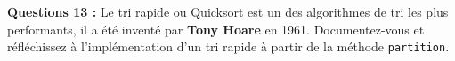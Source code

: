 \documentclass[iutinfo, a4paper, nocorrection, 10pt]{ustl-tdtp}
\begin{document}
\textbf{Questions 13 : }\newline
Le tri rapide ou Quicksort est un des algorithmes de tri les plus performants, il a été inventé par \textbf{Tony Hoare} en 1961. Documentez-vous et réfléchissez à l'implémentation d'un tri rapide à partir de la méthode \texttt{partition}.

%
%


%
\end{document}
